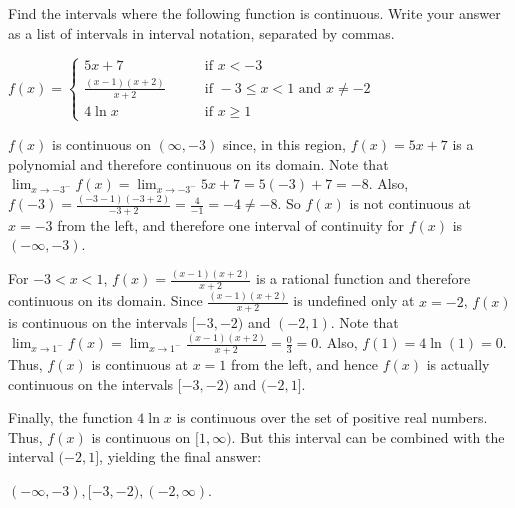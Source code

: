 \documentclass[nooutcomes]{ximera}
\begin{document}
\begin{problem}
Find the intervals where the following function is continuous.  Write your answer as a list of intervals in interval notation, separated by commas.
	
	$f(x) =   \left\{ \begin{array}{cl}
	5x + 7		 	&	\qquad \text{if } x < -3					\\
	\frac{(x-1)(x+2)}{x+2}	&	\qquad \text{if } -3 \leq x < 1 \text{ and } x \neq -2	\\
	4 \ln x				&	\qquad \text{if } x \geq 1					\end{array} \right.  $
	
	\begin{freeResponse}
	
	$f(x)$ is continuous on $(\infty, -3)$ since, in this region, $f(x)=5x+7$ is a polynomial and therefore continuous on its domain.  Note that $\lim_{x \to -3^-} f(x) = \lim_{x \to -3^-} 5x+7 = 5(-3) + 7 = -8$.  Also, $f(-3) = \frac{(-3-1)(-3+2)}{-3+2} = \frac{4}{-1} = -4 \neq -8$.  So $f(x)$ is not continuous at $x=-3$ from the left, and therefore one interval of continuity for $f(x)$ is $(-\infty, -3)$.  
	
	For $-3 < x < 1$, $f(x) = \frac{(x-1)(x+2)}{x+2}$ is a rational function and therefore continuous on its domain.  Since $\frac{(x-1)(x+2)}{x+2}$ is undefined only at $x=-2$, $f(x)$ is continuous on the intervals $[-3,-2)$ and $(-2, 1)$.  Note that $\lim_{x \to 1^-} f(x) = \lim_{x \to 1^-} \frac{(x-1)(x+2)}{x+2} = \frac{0}{3} = 0$.  Also, $f(1) = 4 \ln (1) = 0$.  Thus, $f(x)$ is continuous at $x=1$ from the left, and hence $f(x)$ is actually continuous on the intervals $[-3,-2)$ and $(-2, 1]$.
	
	Finally, the function $4 \ln x$ is continuous over the set of positive real numbers.  Thus, $f(x)$ is continuous on $[1, \infty)$.  But this interval can be combined with the interval $(-2, 1]$, yielding the final answer:
	
	\begin{center}
	$(-\infty, -3), [-3, -2), (-2, \infty)$.
	\end{center}
	
	\end{freeResponse}
	
	
			
	
\end{problem}
	
	
	
	
			
			
\end{document}
